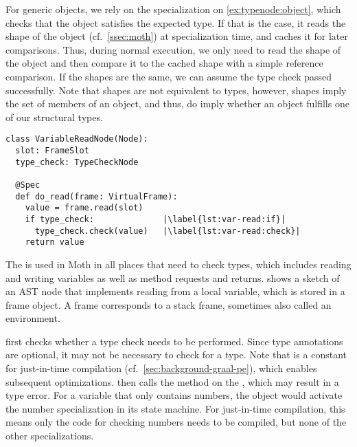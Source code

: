 For generic objects, we rely on the specialization on \cref{ex:typenode:object},
which checks that the object satisfies the expected type.
If that is the case, it reads the shape of the object (cf.\ \cref{ssec:moth}) at specialization time,
and caches it for later comparisons.
Thus, during normal execution,
we only need to read the shape of the object and then compare it to the cached shape
with a simple reference comparison.
If the shapes are the same, we can assume the type check passed successfully.
Note that shapes are not equivalent to types,
however, shapes imply the set of members of an object, and thus,
do imply whether an object fulfills one of our structural types.

\begin{lstlisting}[label={lst:variable-read},escapechar=|,%
  caption={Sketch of a \code{VariableReadNode} using the \code{TypeCheckNode} to ensure Grace's transient semantics.},%
  float,floatplacement=htb,%
  columns=flexible,morekeywords={global,raise,pass,unknown,not}]
class VariableReadNode(Node):
  slot: FrameSlot
  type_check: TypeCheckNode

  @Spec
  def do_read(frame: VirtualFrame):
    value = frame.read(slot)
    if type_check:              |\label{lst:var-read:if}|
      type_check.check(value)   |\label{lst:var-read:check}|
    return value
\end{lstlisting}

The  is used in Moth in all places that need to check
types, which includes  reading and writing variables as well as method
requests and returns.
 shows a sketch of an AST node that implements reading
from a local variable, which is stored in a frame object.
A frame corresponds to a stack frame,  sometimes also called an environment.

 first checks whether a type check needs to be performed.
Since type annotations are optional, it may not be necessary to check for a type.
Note that  is a constant
for just-in-time compilation (cf.\ \cref{sec:background-graal-pe}),
which enables subsequent optimizations.
 then calls the  method on the
, which may result in a type error.
For a variable that only contains numbers, the  object
would activate the number specialization in its state machine.
For just-in-time compilation, this means only the code for
checking numbers needs to be compiled, but none of the other specializations.


